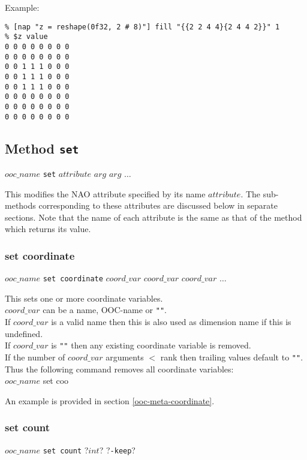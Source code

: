 Example:
  \begin{verbatim}
% [nap "z = reshape(0f32, 2 # 8)"] fill "{{2 2 4 4}{2 4 4 2}}" 1
% $z value
0 0 0 0 0 0 0 0
0 0 0 0 0 0 0 0
0 0 1 1 1 0 0 0
0 0 1 1 1 0 0 0
0 0 1 1 1 0 0 0
0 0 0 0 0 0 0 0
0 0 0 0 0 0 0 0
0 0 0 0 0 0 0 0
\end{verbatim}

\subsection{Method \texttt{set}}
    \label{ooc-modify-set}

  $ooc\_name$ 
  \texttt{set} 
  $attribute$ $arg$ $arg$ $\ldots$

This modifies the NAO attribute specified by 
  its name $attribute$. The sub-methods corresponding to these
  attributes are discussed below in separate sections. Note that the
  name of each attribute is the same as that of the method which
  returns its value.

\subsubsection{set coordinate}
    \label{ooc-modify-set-coordinate}

$ooc\_name$ \texttt{set coordinate} $coord\_var$ $coord\_var$ $coord\_var$ $\ldots$

This sets one or more coordinate variables.
  \\
  $coord\_var$ can be a name, OOC-name or 
  \texttt{""}.
  \\If 
  $coord\_var$ is a valid name then this is also used as
  dimension name if this is undefined.
  \\If 
  $coord\_var$ is 
  \texttt{""} then any existing coordinate variable is
  removed.
  \\If the number of 
  $coord\_var$ arguments $<$ rank then trailing values default
  to 
  \texttt{""}. Thus the following command removes all
  coordinate variables:
\\
$ooc\_name$ set coo

An example is provided in section \ref{ooc-meta-coordinate}.

\subsubsection{set count}
    \label{ooc-modify-set-count}

  $ooc\_name$ \texttt{set count} ?$int$? ?\texttt{-keep}?

